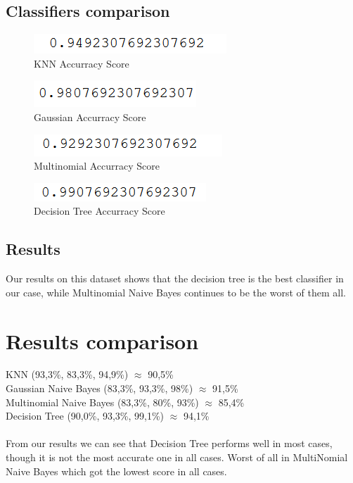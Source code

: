 \documentclass{article}
\begin{document}
\subsection{Classifiers comparison}

\begin{figure}[!h]
  \caption{KNN Accurracy Score}
  \centering
      \includegraphics[scale=0.7]{knnWine.png}
\end{figure}


\begin{figure}[!h]
  \centering
  \caption{Gaussian Accurracy Score}
    \includegraphics[scale=0.7]{GaussianWine.png}
\end{figure}


\begin{figure}[!h]
  \caption{Multinomial Accurracy Score}
  \centering
    \includegraphics[scale=0.7]{multiWine.png}
\end{figure}

\begin{figure}[!h]
  \caption{Decision Tree Accurracy Score}
  \centering
    \includegraphics[scale=0.7]{treeWine.png}
\end{figure}
\FloatBarrier

\subsection{Results}
Our results on this dataset shows that the decision tree is the best classifier in our case, while Multinomial Naive Bayes continues to be the worst of them all.

\section{Results comparison}
KNN (93,3\%, 83,3\%, 94,9\%)   \hfill            $\approx$ 90,5\%  \\
Gaussian Naive Bayes (83,3\%, 93,3\%, 98\%) \hfill     $\approx$ 91,5\%  \\
Multinomial Naive Bayes (83,3\%, 80\%, 93\%) \hfill     $\approx$ 85,4\% \\
Decision Tree (90,0\%, 93,3\%, 99,1\%) \hfill         $\approx$ 94,1\% \\
\\
From our results we can see that Decision Tree performs well in most cases, though it is not the most accurate one in all cases. Worst of all in MultiNomial Naive Bayes which got the lowest score in all cases.
\end{document}
